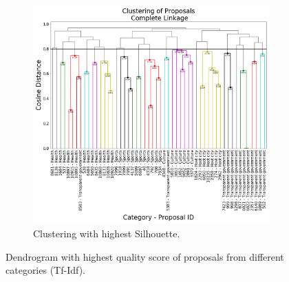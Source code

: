 \begin{figure}[!htpb]
\begin{subfigure}[b]{0.55\textwidth}
  \includegraphics[width=\textwidth]{tfidf/BEST_SIL_MIX.png}
  \caption[]%
  {{\small Clustering with highest Silhouette.}}    
  \label{fig:mix.tfidf.sil}
  \end{subfigure}
\caption{Dendrogram with highest quality score of proposals from different categories (Tf-Idf).}
\label{fig:mix.tfidf.dendro}
\end{figure}

\FloatBarrier
